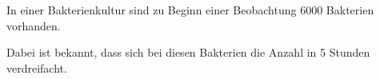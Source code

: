 \documentclass[answers]{exam}
\renewcommand{\d}{\,\mathrm{d}}
\begin{document}
\begin{questions}

    \newpage
    \question
    In einer Bakterienkultur sind zu Beginn einer Beobachtung 6000 Bakterien vorhanden.

    Dabei ist bekannt, dass sich bei diesen Bakterien die Anzahl in 5 Stunden verdreifacht.

    \begin{parts}

\end{parts}
\end{questions}
\end{document}
